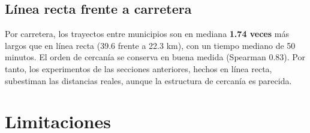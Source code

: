 \documentclass[11pt,letterpaper]{article}
\begin{document}
\subsection{Línea recta frente a carretera}

Por carretera, los trayectos entre municipios son en mediana \textbf{1.74 veces} más largos que en línea recta (39.6 frente a 22.3 km), con un tiempo mediano de 50 minutos. El orden de cercanía se conserva en buena medida (Spearman 0.83). Por tanto, los experimentos de las secciones anteriores, hechos en línea recta, subestiman las distancias reales, aunque la estructura de cercanía es parecida.

\section{Limitaciones}
\label{sec:limitaciones}
\end{document}
